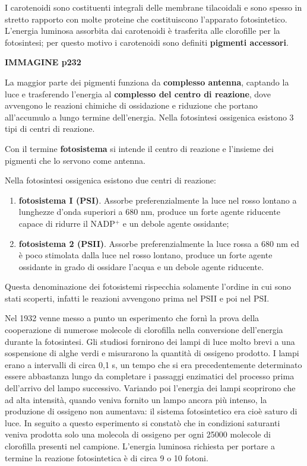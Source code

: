 \documentclass[]{article}
\begin{document}
I carotenoidi sono costituenti integrali delle membrane tilacoidali e
sono spesso in stretto rapporto con molte proteine che costituiscono
l'apparato fotosintetico. L'energia luminosa assorbita dai carotenoidi è
trasferita alle clorofille per la fotosintesi; per questo motivo i
carotenoidi sono definiti \textbf{pigmenti accessori}.

\textbf{IMMAGINE p232}

La maggior parte dei pigmenti funziona da \textbf{complesso antenna},
captando la luce e trasferendo l'energia al \textbf{complesso del centro
di reazione}, dove avvengono le reazioni chimiche di ossidazione e
riduzione che portano all'accumulo a lungo termine dell'energia. Nella
fotosintesi ossigenica esistono 3 tipi di centri di reazione.

Con il termine \textbf{fotosistema} si intende il centro di reazione e
l'insieme dei pigmenti che lo servono come antenna.


Nella fotosintesi ossigenica esistono due centri di reazione:

\begin{enumerate}
\def\labelenumi{\arabic{enumi}.}
\itemsep1pt\parskip0pt
\item
  \textbf{fotosistema I (PSI)}. Assorbe preferenzialmente la luce nel
  rosso lontano a lunghezze d'onda superiori a 680 nm, produce un forte
  agente riducente capace di ridurre il NADP$^+$ e un debole agente
  ossidante;
\item
  \textbf{fotosistema 2 (PSII)}. Assorbe preferenzialmente la luce rossa
  a 680 nm ed è poco stimolata dalla luce nel rosso lontano, produce un
  forte agente ossidante in grado di ossidare l'acqua e un debole agente riducente.
\end{enumerate}

Questa denominazione dei fotosistemi rispecchia solamente l'ordine in
cui sono stati scoperti, infatti le reazioni avvengono prima nel PSII e
poi nel PSI.

Nel 1932 venne messo a punto un esperimento che fornì la prova della
cooperazione di numerose molecole di clorofilla nella conversione
dell'energia durante la fotosintesi. Gli studiosi fornirono dei lampi di
luce molto brevi a una sospensione di alghe verdi e misurarono la
quantità di ossigeno prodotto. I lampi erano a intervalli di circa 0,1
s, un tempo che si era precedentemente determinato essere abbastanza
lungo da completare i passaggi enzimatici del processo prima dell'arrivo
del lampo successivo. Variando poi l'energia dei lampi scoprirono che ad
alta intensità, quando veniva fornito un lampo ancora più intenso, la
produzione di ossigeno non aumentava: il sistema fotosintetico era cioè
saturo di luce. In seguito a questo esperimento si constatò che in
condizioni saturanti veniva prodotta solo una molecola di ossigeno per
ogni 25000 molecole di clorofilla presenti nel campione. L'energia
luminosa richiesta per portare a termine la reazione fotosintetica è di
circa 9 o 10 fotoni.
\end{document}
